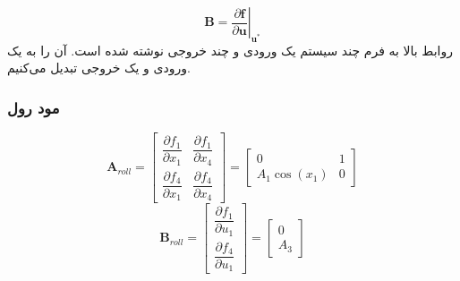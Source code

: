 \begin{equation}
	\boldsymbol B = \left.\dfrac{\partial \boldsymbol f}{\partial \boldsymbol u}\right\vert_{\boldsymbol{u^*}}
\end{equation}
روابط بالا به فرم چند سیستم یک ورودی و چند خروجی نوشته ‌شده ‌است. آن را به یک ورودی و یک خروجی تبدیل می‌کنیم.
\subsubsection{مود رول}
\begin{equation}
	\boldsymbol A_{roll} = \begin{bmatrix}
		\dfrac{\partial  f_1}{\partial  x_1}& \dfrac{\partial  f_1}{\partial  x_4}
		\\[1em]
		\dfrac{\partial  f_4}{\partial  x_1}& \dfrac{\partial  f_4}{\partial  x_4}
	\end{bmatrix} = 
	\begin{bmatrix}
		0 & 1\\
		A_1\cos(x_1) & 0
	\end{bmatrix}
\end{equation}
\begin{equation}
	\boldsymbol B_{roll} = \begin{bmatrix}
		\dfrac{\partial  f_1}{\partial  u_1}
		\\[1em]
		\dfrac{\partial  f_4}{\partial  u_1}
	\end{bmatrix} = 
	\begin{bmatrix}
		0\\
		A_3
	\end{bmatrix}
\end{equation}

